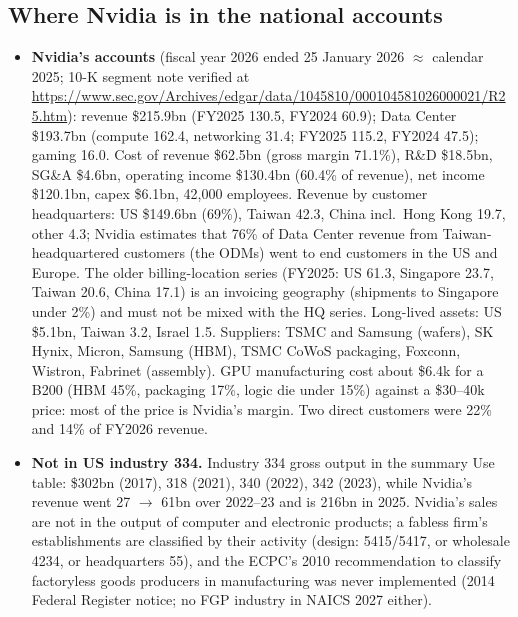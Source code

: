\documentclass[11pt]{article}
\begin{document}
\subsection{Where Nvidia is in the national accounts}
\begin{itemize}
  \item \textbf{Nvidia's accounts} (fiscal year 2026 ended 25 January 2026 $\approx$ calendar 2025; 10-K segment note verified at \url{https://www.sec.gov/Archives/edgar/data/1045810/000104581026000021/R25.htm}): revenue \$215.9bn (FY2025 130.5, FY2024 60.9); Data Center \$193.7bn (compute 162.4, networking 31.4; FY2025 115.2, FY2024 47.5); gaming 16.0. Cost of revenue \$62.5bn (gross margin 71.1\%), R\&D \$18.5bn, SG\&A \$4.6bn, operating income \$130.4bn (60.4\% of revenue), net income \$120.1bn, capex \$6.1bn, 42{,}000 employees. Revenue by customer headquarters: US \$149.6bn (69\%), Taiwan 42.3, China incl.\ Hong Kong 19.7, other 4.3; Nvidia estimates that 76\% of Data Center revenue from Taiwan-headquartered customers (the ODMs) went to end customers in the US and Europe. The older billing-location series (FY2025: US 61.3, Singapore 23.7, Taiwan 20.6, China 17.1) is an invoicing geography (shipments to Singapore under 2\%) and must not be mixed with the HQ series. Long-lived assets: US \$5.1bn, Taiwan 3.2, Israel 1.5. Suppliers: TSMC and Samsung (wafers), SK Hynix, Micron, Samsung (HBM), TSMC CoWoS packaging, Foxconn, Wistron, Fabrinet (assembly). GPU manufacturing cost about \$6.4k for a B200 (HBM 45\%, packaging 17\%, logic die under 15\%) against a \$30--40k price: most of the price is Nvidia's margin. Two direct customers were 22\% and 14\% of FY2026 revenue.
  \item \textbf{Not in US industry 334.} Industry 334 gross output in the summary Use table: \$302bn (2017), 318 (2021), 340 (2022), 342 (2023), while Nvidia's revenue went 27 $\to$ 61bn over 2022--23 and is 216bn in 2025. Nvidia's sales are not in the output of computer and electronic products; a fabless firm's establishments are classified by their activity (design: 5415/5417, or wholesale 4234, or headquarters 55), and the ECPC's 2010 recommendation to classify factoryless goods producers in manufacturing was never implemented (2014 Federal Register notice; no FGP industry in NAICS 2027 either).

\end{itemize}
\end{document}
